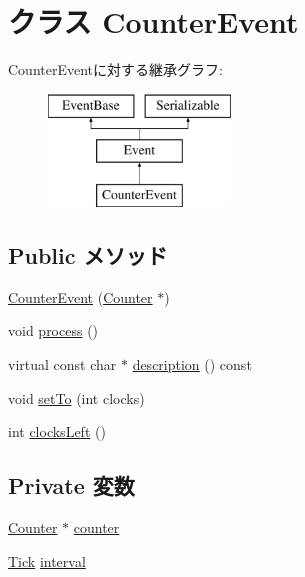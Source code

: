 \hypertarget{classIntel8254Timer_1_1Counter_1_1CounterEvent}{
\section{クラス CounterEvent}
\label{classIntel8254Timer_1_1Counter_1_1CounterEvent}
}
CounterEventに対する継承グラフ:\begin{figure}[H]
\begin{center}
\leavevmode
\includegraphics[height=3cm]{classIntel8254Timer_1_1Counter_1_1CounterEvent}
\end{center}
\end{figure}
\subsection*{Public メソッド}
\begin{DoxyCompactItemize}
\item 
\hyperlink{classIntel8254Timer_1_1Counter_1_1CounterEvent_ab6d9218485f102565f36e311280c4492}{CounterEvent} (\hyperlink{classIntel8254Timer_1_1Counter}{Counter} $\ast$)
\item 
void \hyperlink{classIntel8254Timer_1_1Counter_1_1CounterEvent_a2e9c5136d19b1a95fc427e0852deab5c}{process} ()
\item 
virtual const char $\ast$ \hyperlink{classIntel8254Timer_1_1Counter_1_1CounterEvent_a5a14fe478e2393ff51f02e9b7be27e00}{description} () const 
\item 
void \hyperlink{classIntel8254Timer_1_1Counter_1_1CounterEvent_a4c9a6b4dc5fd7f9ed1cfa6587d824b2c}{setTo} (int clocks)
\item 
int \hyperlink{classIntel8254Timer_1_1Counter_1_1CounterEvent_aa10572135976d91fe76781b80fd2f77a}{clocksLeft} ()
\end{DoxyCompactItemize}
\subsection*{Private 変数}
\begin{DoxyCompactItemize}
\item 
\hyperlink{classIntel8254Timer_1_1Counter}{Counter} $\ast$ \hyperlink{classIntel8254Timer_1_1Counter_1_1CounterEvent_af05ae4262e2f5c2cfb3cbdd872b69c38}{counter}
\item 
\hyperlink{base_2types_8hh_a5c8ed81b7d238c9083e1037ba6d61643}{Tick} \hyperlink{classIntel8254Timer_1_1Counter_1_1CounterEvent_a75c022086cc1012d51fcf693b9539b8f}{interval}
\end{DoxyCompactItemize}
